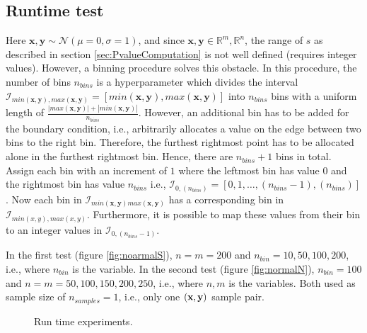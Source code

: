 \documentclass[a4paper]{article}
\begin{document}
\subsection{Runtime test}
Here $\bm{x},\bm{y} \sim \mathcal{N}(\mu = 0,\sigma =1)$, and since $\bm{x},\bm{y} \in \mathbb{R}^{m}, \mathbb{R}^{n}$, the range of $s$ as described in section \ref{sec:PvalueComputation} is not well defined (requires integer values). However, a binning procedure solves this obstacle. In this procedure, the number of bins $n_{bins}$ is a hyperparameter which divides the interval $\mathcal{I}_{min(\bm{x},\bm{y}), max(\bm{x},\bm{y})}=[ min(\bm{x},\bm{y}), max(\bm{x},\bm{y}) ]$ into $n_{bins}$ bins with a uniform length of $\frac{|max(\bm{x},\bm{y})| + |min(\bm{x},\bm{y})|}{n_{bins}}$. However, an additional bin has to be added for the boundary condition, i.e., arbitrarily allocates a value on the edge between two bins to the right bin. Therefore, the furthest rightmost point has to be allocated alone in the furthest rightmost bin. Hence, there are $n_{bins}+1$ bins in total. Assign each bin with an increment of $1$ where the leftmost bin has value $0$ and the rightmost bin has value $n_{bins}$ i.e., $\mathcal{I}_{0, (n_{bins})}=[0,1,\ldots,(n_{bins}-1),(n_{bins})]$. Now each bin in $\mathcal{I}_{min(\bm{x},\bm{y}) max(\bm{x},\bm{y})}$ has a corresponding bin in $\mathcal{I}_{min(x,y), max(x,y)}$. Furthermore, it is possible to map these values from their bin to an integer values in $\mathcal{I}_{0, (n_{bins}-1)}$.


In the first test (figure \ref{fig:noarmalS}), $n=m=200$ and $n_{bin}=10,50,100,200$, i.e., where $n_{bin}$ is the variable. In the second test (figure \ref{fig:normalN}), $n_{bin}=100$ and $n=m=50, 100,150,200,250$, i.e., where $n,m$ is the variables. Both used as sample size of $n_{samples}=1$, i.e., only one $(\bf{x}, \bf{y})$ sample pair.

\FloatBarrier
\begin{figure}[!tbp]
  \centering
  \hfill
  \caption{Run time experiments.}
\end{figure}
\FloatBarrier
\end{document}
